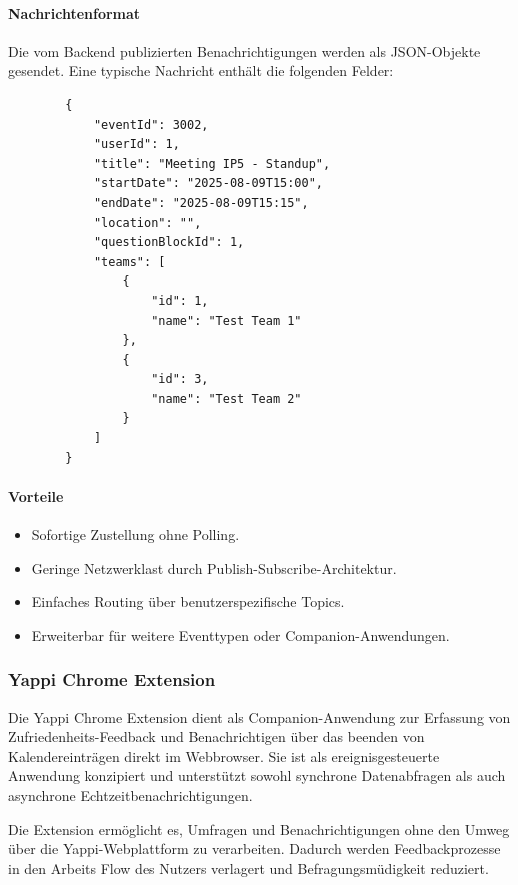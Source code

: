 \documentclass[12pt,a4paper]{report}
\begin{document}
\paragraph{Nachrichtenformat}
    Die vom Backend publizierten Benachrichtigungen werden als JSON-Objekte gesendet.
    Eine typische Nachricht enthält die folgenden Felder:

    \begin{verbatim}
        {
            "eventId": 3002,
            "userId": 1,
            "title": "Meeting IP5 - Standup",
            "startDate": "2025-08-09T15:00",
            "endDate": "2025-08-09T15:15",
            "location": "",
            "questionBlockId": 1,
            "teams": [
                {
                    "id": 1,
                    "name": "Test Team 1"
                },
                {
                    "id": 3,
                    "name": "Test Team 2"
                }
            ]
        }
    \end{verbatim}

\paragraph{Vorteile}
    \begin{itemize}
        \item Sofortige Zustellung ohne Polling.
        \item Geringe Netzwerklast durch Publish-Subscribe-Architektur.
        \item Einfaches Routing über benutzerspezifische Topics.
        \item Erweiterbar für weitere Eventtypen oder Companion-Anwendungen.
    \end{itemize}


\subsubsection{Yappi Chrome Extension}
    Die Yappi Chrome Extension dient als Companion-Anwendung zur Erfassung von Zufriedenheits-Feedback und Benachrichtigen
    über das beenden von Kalendereinträgen direkt im Webbrowser.
    Sie ist als ereignisgesteuerte Anwendung konzipiert und unterstützt sowohl synchrone Datenabfragen als auch
    asynchrone Echtzeitbenachrichtigungen.

    Die Extension ermöglicht es, Umfragen und Benachrichtigungen ohne den Umweg über die Yappi-Webplattform zu verarbeiten.
    Dadurch werden Feedbackprozesse in den Arbeits Flow des Nutzers verlagert und Befragungsmüdigkeit reduziert.
\end{document}
